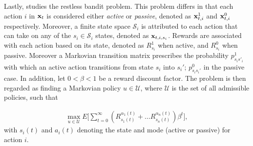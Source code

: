 Lastly, \citep{alon} studies the restless bandit problem. This problem differs in that each action $i$ in ${\bf x}_{t}$ is considered either \textit{active} or \textit{passive}, denoted as ${\bf x}_{t,i}^1$ and ${\bf x}_{t,i}^0$ respectively. Moreover, a finite state space $\mathcal{S}_i$ is attributed to each action that can take on any of the $s_i\in \mathcal{S}_i$ states, denoted as ${\bf x}_{t, i, s_i}$. Rewards are associated with each action based on its state, denoted as $R_{s_i}^1$ when active, and $R_{s_i}^0$ when passive. Moreover a Markovian transition matrix prescribes the probability $p^1_{s_is'_i}$ with which an active action transitions from state $s_i$ into $s_i'$; $p^0_{s_is_i'}$ in the passive case. In addition, let $0<\beta<1$ be a reward discount factor. The problem is then regarded as finding a Markovian policy $u\in \mathcal{U}$, where $\mathcal{U}$ is the set of all admissible policies, such that 

\begin{align}
	\max_{u\in\mathcal{U}}E\bigg[\sum_{t=0}^\infty(R_{s_1(t)}^{\alpha_1(t)}+...R_{s_n(t)}^{\alpha_n(t)})\beta^t\bigg],
\end{align}
with $s_i(t)$ and $a_i(t)$ denoting the state and mode (active or passive) for action $i$.